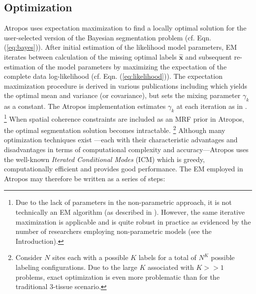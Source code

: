\documentclass[11pt,english]{article}
\begin{document}
\subsection{Optimization}
Atropos uses expectation maximization to find a locally optimal
solution for the user-selected version of the Bayesian segmentation
problem (cf. Eqn. (\ref{eq:bayes})).
After initial estimation of the
likelihood model parameters, EM iterates between calculation of the
missing optimal labels $\hat{\mathbf{x}}$ and subsequent re-estimation of the model
parameters by maximizing the expectation of the complete data
log-likelihood (cf. Eqn. (\ref{eq:likelihood})).  
The expectation maximization procedure is derived in various
publications including \cite{Zhang2001} which yields the optimal mean
and variance (or covariance), but sets the mixing parameter $\gamma_k$
as a constant.  The Atropos implementation estimates $\gamma_k$ at
each iteration as in \cite{Ashburner2005}.
\footnote{
Due to the lack of parameters in the non-parametric approach, it is not technically an EM algorithm (as described in \cite{Wells1996}).  However, the same iterative maximization is applicable and is quite robust in practice as evidenced by the number of researchers employing non-parametric models (see the Introduction).
}  
When spatial coherence constraints are included as an MRF prior in Atropos, the optimal segmentation solution becomes intractable.%
\footnote{
Consider $N$ sites each with a possible $K$ labels for a total of $N^K$ possible labeling configurations.  Due to the large $K$ associated with $K>>1$ problems, exact optimization is even more problematic than for the traditional 3-tissue scenario.
}
Although many optimization techniques exist \citep[see the
introduction in][for a concise summary of the myriad optimization
possibilities]{Marroquin2002}---each with their characteristic
advantages and disadvantages in terms of computational complexity and
accuracy---Atropos uses the well-known {\em Iterated Conditional
  Modes} (ICM)  \citep{Besag1986} which is greedy, computationally
efficient and provides good performance.  The EM employed in
Atropos may therefore be written as a series of steps:
\end{document}
